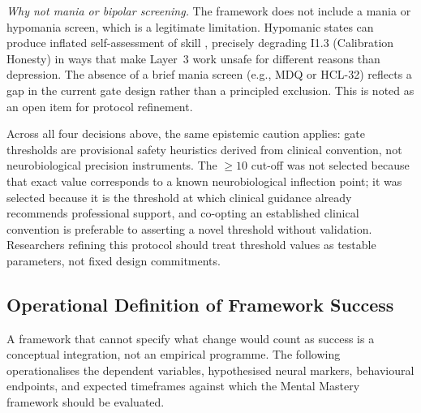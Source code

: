 \documentclass[12pt, a4paper]{article}
\begin{document}
\emph{Why not mania or bipolar screening.} The framework does not include a mania
or hypomania screen, which is a legitimate limitation. Hypomanic states can produce
inflated self-assessment of skill \citep{molenberghs2016}, precisely degrading I1.3
(Calibration Honesty) in ways that make Layer~3 work unsafe for different reasons
than depression. The absence of a brief mania screen (e.g., MDQ or HCL-32) reflects
a gap in the current gate design rather than a principled exclusion. This is noted
as an open item for protocol refinement.

Across all four decisions above, the same epistemic caution applies: gate thresholds
are provisional safety heuristics derived from clinical convention, not neurobiological
precision instruments. The $\geq 10$ cut-off was not selected because that exact value
corresponds to a known neurobiological inflection point; it was selected because it
is the threshold at which clinical guidance already recommends professional support,
and co-opting an established clinical convention is preferable to asserting a novel
threshold without validation. Researchers refining this protocol should treat
threshold values as testable parameters, not fixed design commitments.

\subsection{Operational Definition of Framework Success}

A framework that cannot specify what change would count as success is a conceptual
integration, not an empirical programme. The following operationalises the dependent
variables, hypothesised neural markers, behavioural endpoints, and expected timeframes
against which the Mental Mastery framework should be evaluated.
\end{document}
